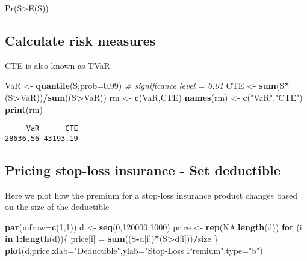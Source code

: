 \documentclass[]{book}
\newenvironment{Shaded}{\begin{snugshade}}{\end{snugshade}}
\newcommand{\KeywordTok}[1]{\textcolor[rgb]{0.13,0.29,0.53}{\textbf{#1}}}
\newcommand{\DataTypeTok}[1]{\textcolor[rgb]{0.13,0.29,0.53}{#1}}
\newcommand{\DecValTok}[1]{\textcolor[rgb]{0.00,0.00,0.81}{#1}}
\newcommand{\FloatTok}[1]{\textcolor[rgb]{0.00,0.00,0.81}{#1}}
\newcommand{\StringTok}[1]{\textcolor[rgb]{0.31,0.60,0.02}{#1}}
\newcommand{\CommentTok}[1]{\textcolor[rgb]{0.56,0.35,0.01}{\textit{#1}}}
\newcommand{\OtherTok}[1]{\textcolor[rgb]{0.56,0.35,0.01}{#1}}
\newcommand{\ControlFlowTok}[1]{\textcolor[rgb]{0.13,0.29,0.53}{\textbf{#1}}}
\newcommand{\OperatorTok}[1]{\textcolor[rgb]{0.81,0.36,0.00}{\textbf{#1}}}
\newcommand{\NormalTok}[1]{#1}
\theoremstyle{definition}
\theoremstyle{definition}
\theoremstyle{definition}
\theoremstyle{remark}
\begin{document}
Pr(S\textgreater{}E(S))

\subsection{Calculate risk measures}\label{calculate-risk-measures}

CTE is also known as TVaR

\begin{Shaded}
\begin{Highlighting}[]
\NormalTok{VaR <-}\StringTok{ }\KeywordTok{quantile}\NormalTok{(S,}\DataTypeTok{prob=}\FloatTok{0.99}\NormalTok{)         }\CommentTok{# significance level = 0.01}
\NormalTok{CTE <-}\StringTok{ }\KeywordTok{sum}\NormalTok{(S}\OperatorTok{*}\NormalTok{(S}\OperatorTok{>}\NormalTok{VaR))}\OperatorTok{/}\KeywordTok{sum}\NormalTok{((S}\OperatorTok{>}\NormalTok{VaR))}
\NormalTok{rm <-}\StringTok{ }\KeywordTok{c}\NormalTok{(VaR,CTE)}
\KeywordTok{names}\NormalTok{(rm) <-}\StringTok{ }\KeywordTok{c}\NormalTok{(}\StringTok{"VaR"}\NormalTok{,}\StringTok{"CTE"}\NormalTok{)}
\KeywordTok{print}\NormalTok{(rm)}
\end{Highlighting}
\end{Shaded}

\begin{verbatim}
     VaR      CTE 
28636.56 43193.19 
\end{verbatim}

\subsection{Pricing stop-loss insurance - Set
deductible}\label{pricing-stop-loss-insurance---set-deductible}

Here we plot how the premium for a stop-loss insurance product changes
based on the size of the deductible

\begin{Shaded}
\begin{Highlighting}[]
\KeywordTok{par}\NormalTok{(}\DataTypeTok{mfrow=}\KeywordTok{c}\NormalTok{(}\DecValTok{1}\NormalTok{,}\DecValTok{1}\NormalTok{))}
\NormalTok{d <-}\StringTok{ }\KeywordTok{seq}\NormalTok{(}\DecValTok{0}\NormalTok{,}\DecValTok{120000}\NormalTok{,}\DecValTok{1000}\NormalTok{)}
\NormalTok{price <-}\StringTok{ }\KeywordTok{rep}\NormalTok{(}\OtherTok{NA}\NormalTok{,}\KeywordTok{length}\NormalTok{(d))}
\ControlFlowTok{for}\NormalTok{ (i }\ControlFlowTok{in} \DecValTok{1}\OperatorTok{:}\KeywordTok{length}\NormalTok{(d))\{}
\NormalTok{  price[i] =}\StringTok{ }\KeywordTok{sum}\NormalTok{((S}\OperatorTok{-}\NormalTok{d[i])}\OperatorTok{*}\NormalTok{(S}\OperatorTok{>}\NormalTok{d[i]))}\OperatorTok{/}\NormalTok{size}
\NormalTok{\}}
\KeywordTok{plot}\NormalTok{(d,price,}\DataTypeTok{xlab=}\StringTok{"Deductible"}\NormalTok{,}\DataTypeTok{ylab=}\StringTok{"Stop-Loss Premium"}\NormalTok{,}\DataTypeTok{type=}\StringTok{"b"}\NormalTok{)}
\end{Highlighting}
\end{Shaded}
\end{document}
